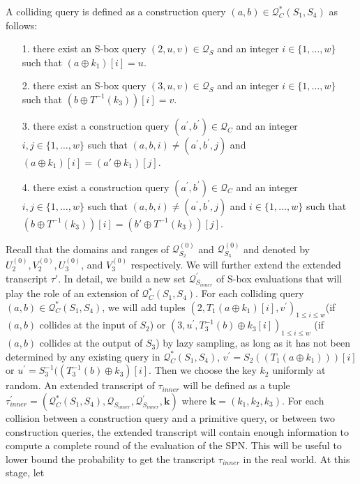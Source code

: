 A colliding query is defined as a construction query $(a, b) \in \mathcal{Q}_{C}^{*}\left(S_{1}, S_{4}\right)$ as follows:
%
\begin{itemize}
	\item[1.]
	there exist an S-box query $(2, u, v) \in \mathcal{Q}_{S}$ and an integer $i \in\{1, \ldots, w\}$ such that $\left(a \oplus k_1\right)[i]=u$.
	\item[2.]
	there exist an S-box query $(3, u, v) \in \mathcal{Q}_{S}$ and an integer $i \in\{1, \ldots, w\}$ such that $\left(b \oplus T^{-1}(k_3)\right)[i]=v$.
	\item[3.] there exist a construction query $\left(a^{\prime}, b^{\prime}\right) \in \mathcal{Q}_{C}$ and an integer $i,j \in\{1, \ldots, w\}$ such that $(a, b, i) \neq\left(a^{\prime}, b^{\prime}, j\right)$ and $\left(a \oplus k_1\right)[i] = \left(a' \oplus k_1\right)[j]$.
	\item[4.] there exist a construction query $\left(a^{\prime}, b^{\prime}\right) \in \mathcal{Q}_{C}$ and an integer $i,j \in\{1, \ldots, w\}$ such that $(a, b, i) \neq\left(a^{\prime}, b^{\prime}, j\right)$ and $i \in\{1, \ldots, w\}$ such that $\left(b \oplus T^{-1}(k_3)\right)[i] = \left(b' \oplus T^{-1}(k_3)\right)[j]$.
\end{itemize}
%
%
Recall that the domains and ranges of $\mathcal{Q}_{S_{2}}^{(0)}$ and $\mathcal{Q}_{S_{3}}^{(0)}$ and denoted by $U_{2}^{(0)},V_{2}^{(0)},U_{3}^{(0)}$, and $V_{3}^{(0)}$ respectively. We will further extend the extended transcript $\tau'$. In detail, we build a new set $\mathcal{Q}_{S_{inner}}^{\prime}$ of S-box evaluations that will play the role of an extension of $\mathcal{Q}_{C}^{*}\left(S_{1}, S_{4}\right)$. For each colliding query $(a, b) \in \mathcal{Q}_{C}^{*}\left(S_{1}, S_{4}\right)$, we will add tuples $\left(2, T_1\left(a \oplus k_{1}\right)[i], v^{\prime}\right)_{1 \leq i \leq w}$(if $(a, b)$ collides at the input of $S_2$) or $\left(3, u^{\prime}, T_{3}^{-1}\left(b\right) \oplus k_{3}[i]\right)_{1 \leq i \leq w}$ (if $(a, b)$ collides at the output of $S_3$) by lazy sampling, as long as it has not been determined by any existing query in $\mathcal{Q}_{C}^{*}\left(S_{1}, S_{4}\right)$, $v^{\prime}=S_{2}(\left(T_1\left(a \oplus k_{1}\right)\right))[i]$ or $u^{\prime}=S_{3}^{-1}(\left(T_{3}^{-1}\left(b\right) \oplus k_{3}\right)[i]$. Then we choose the key $k_2$ uniformly at random. An extended transcript of $\tau_{inner}$ will be defined as a tuple $\tau_{inner}^{\prime}=\left(\mathcal{Q}_{C}^{*}\left(S_{1}, S_{4}\right), \mathcal{Q}_{S_{inner}}, \mathcal{Q}_{S_{inner}}^{\prime}, \mathbf{k}\right)$ where $\mathbf{k}=\left(k_{1}, k_{2}, k_{3}\right)$. For each collision between a construction query and a primitive query, or between two construction queries, the extended transcript will contain enough information to compute a complete round of the evaluation of the SPN. This will be useful to lower bound the probability to get the transcript $\tau_{inner}$ in the real world. At this stage, let
